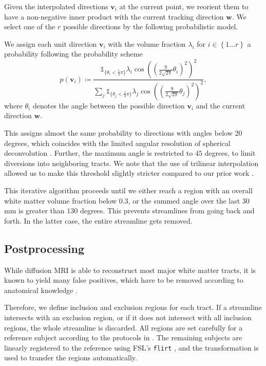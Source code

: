 Given the interpolated directions $\mathbf{v}_i$ at the current point, we
reorient them to have a non-negative inner product with the current tracking
direction $\mathbf{w}$. We select one of the $r$ possible directions by the
following probabilistic model.

We assign each unit direction $\mathbf{v}_i$ with the volume fraction
$\lambda_i$ for $i \in \left\{ 1\dots r \right\}$ a probability following the probability
scheme 
\[
	p \left( \mathbf{v}_i \right) \coloneqq \frac{ \mathbb{1}_{\lbrace\theta_i <
		\frac{1}{3} \pi \rbrace} \lambda_i \cos \left( \left( \frac{9}{2\sqrt{2
\pi}} \theta_i \right)^2 \right)^2}{\sum_j \mathbb{1}_{\lbrace\theta_j <
		\frac{1}{3} \pi \rbrace} \lambda_j \cos \left( \left( \frac{9}{2\sqrt{2
\pi}} \theta_j \right)^2 \right)^2 }, 
\]
where $\theta_i$ denotes the angle between the possible direction $\mathbf{v}_i$
and the current direction $\mathbf{w}$. 

This assigns almost the same probability to directions with angles below 20 degrees, which coincides with the limited angular resolution of
spherical deconvolution \cite{TOURNIER20071459}. Further, the maximum angle is
restricted to $45$ degrees, to limit diversions into neighboring tracts. We note that the use of trilinear interpolation allowed us to make this threshold slightly stricter compared to our prior work \cite{Gruen:2021}.

This iterative algorithm proceeds until we either reach a region with an overall white matter volume fraction below $0.3$, or the summed angle over the last $30$ mm is greater than
$130$ degrees. This prevents streamlines from going back and forth. In the latter case,
the entire streamline gets removed. 

\subsection{Postprocessing}
\label{sec:postprocessing}
While diffusion MRI is able to reconstruct most major white
matter tracts, it is known to yield many false
positives, which have to be removed according to anatomical knowledge
\cite{MaierHein:2017}. %

Therefore, we define inclusion and exclusion regions for each tract. If a streamline intersects with an exclusion region, or if it  does not intersect with all inclusion regions, the whole streamline is discarded. All regions
are set carefully for a reference subject according to the protocols in
\cite{Wakana:2007}.
The remaining subjects are linearly registered to the reference using FSL's \texttt{flirt} \cite{FSL}, and the transformation is used to transfer the regions automatically.

